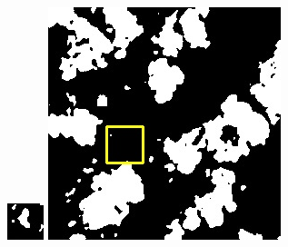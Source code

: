 \documentclass[10pt,UTF8,fntef]{ctexart}
\begin{document}
\begin{multicols}{2}
\begin{figure}[H]
{\begin{minipage}[b]{0.15\linewidth}
            \includegraphics[width=1\linewidth]{../log/spoon4/cut/tmp_cut_LC80460282014171LGN00_12556_unet.jpg}\vspace{4pt}
            \includegraphics[width=1\linewidth]{../log/spoon4/cut/LC80980712014024LGN00_15440_unet.jpg}\vspace{4pt}

\end{minipage}}
\end{figure}
\end{multicols}
\end{document}
